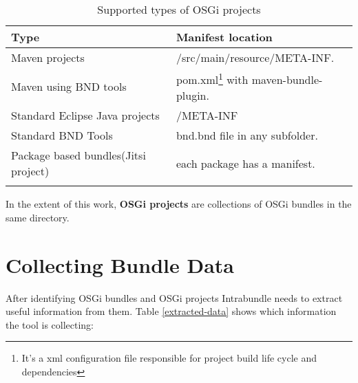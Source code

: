\begin{table}[h]
\caption{Supported types of OSGi projects}
\label{osgi-project-type}
\begin{center}
    \begin{tabular}{  p{4cm} | p{6cm} }
    \Xhline{2\arrayrulewidth}
    Type & Manifest location \\  \hline
    Maven projects & /src/main/resource/META-INF.\\ \hline
    Maven using BND tools & pom.xml\footnote{It's a xml configuration file responsible for project build life cycle and dependencies} with maven-bundle-plugin.\\ \hline
    Standard Eclipse Java projects & /META-INF\\ \hline
    Standard BND Tools & bnd.bnd file in any subfolder.\\ \hline
    Package based bundles(Jitsi project) & each package has a manifest.\\  
   \Xhline{2\arrayrulewidth}

    \end{tabular}
\end{center}
\end{table}
\FloatBarrier

In the extent of this work, \textbf{OSGi projects} are collections of OSGi bundles in the same directory.

\section{Collecting Bundle Data}
After identifying OSGi bundles and OSGi projects Intrabundle needs to extract useful information from them. Table \ref{extracted-data} shows which information the tool is collecting:


